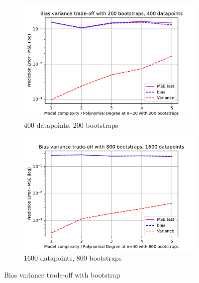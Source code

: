 \documentclass[11pt, a4paper]{article}
\begin{document}
\begin{figure}
  \centering
  \begin{subfigure}{0.49\textwidth}
      \centering
      \includegraphics[width=\textwidth]{figures/EX2_model_complexity_using_bootstrap_function_n_20.pdf}
      \caption{400 datapoints, 200 bootstraps}
      \label{fig:bootstrap_bias_var_n_20}
  \end{subfigure}
  \hfill
  \begin{subfigure}{0.49\textwidth}
      \centering
      \includegraphics[width=\textwidth]{figures/EX2_model_complexity_using_bootstrap_function_n_40.pdf}
      \caption{1600 datapoints, 800 bootstraps}
      \label{fig:bootstrap_bias_var_n_30}
  \end{subfigure}

     \caption{Bias variance trade-off with bootstrap}
     \label{fig:bootstrap_bias_var}
\end{figure}
\end{document}
